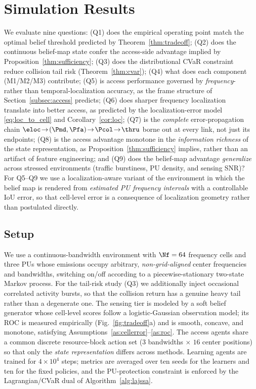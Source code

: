 \section{Simulation Results}
\label{sec:simulation}

We evaluate nine questions: (Q1) does the empirical operating point match the
optimal belief threshold predicted by Theorem~\ref{thm:tradeoff}; (Q2) does
the continuous belief-map state confer the access-side advantage implied by
Proposition~\ref{thm:sufficiency}; (Q3) does the distributional CVaR
constraint reduce collision tail risk (Theorem~\ref{thm:cvar}); (Q4) what does
each component (M1/M2/M3) contribute; (Q5) is access performance governed by
\emph{frequency}- rather than temporal-localization accuracy, as the frame
structure of Section~\ref{subsec:access} predicts; (Q6) does sharper
frequency localization translate into better access, as predicted by the
localization-error model \eqref{eq:loc_to_cell} and Corollary~\ref{cor:loc};
(Q7) is the \emph{complete} error-propagation chain
$\eloc\!\to\!(\Pmd,\Pfa)\!\to\!\Pcol\!\to\!\thru$ borne out at every link, not
just its endpoints; (Q8) is the access advantage monotone in the
\emph{information richness} of the state representation, as
Proposition~\ref{thm:sufficiency} implies, rather than an artifact of feature
engineering; and (Q9) does the belief-map advantage \emph{generalize} across
stressed environments (traffic burstiness, PU density, and sensing SNR)?
For Q5--Q9 we use a localization-aware variant of the environment in which the
belief map is rendered from \emph{estimated PU frequency intervals} with a
controllable IoU error, so that cell-level error is a consequence of
localization geometry rather than postulated directly.

\subsection{Setup}
We use a continuous-bandwidth environment with $\Nf=64$ frequency cells and
three PUs whose emissions occupy arbitrary, \emph{non-grid-aligned} center
frequencies and bandwidths, switching on/off according to a
piecewise-stationary two-state Markov process. For the tail-risk study (Q3)
we additionally inject occasional correlated activity bursts, so that the
collision return has a genuine heavy tail rather than a degenerate one. The
sensing tier is modeled by a soft belief generator whose cell-level scores
follow a logistic-Gaussian observation model; its ROC is measured empirically
(Fig.~\ref{fig:tradeoff}a) and is
smooth, concave, and monotone, satisfying
Assumptions~\ref{as:cellerror}--\ref{as:roc}. The access agents share a common
discrete resource-block action set ($3$ bandwidths $\times$ $16$ center
positions) so that only the \emph{state representation} differs across
methods. Learning agents are trained for $4\times10^4$ steps; metrics are
averaged over ten seeds for the learners and ten for the fixed policies, and
the PU-protection constraint is enforced by the Lagrangian/CVaR dual of
Algorithm~\ref{alg:lajssa}.

